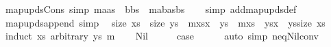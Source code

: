 \begin{isabellebody}
\endisatagproof
{\isafoldproof}%
%
\isadelimproof
\isanewline
%
\endisadelimproof
\isanewline
{}\isamarkupfalse%
\ map{\isacharunderscore}{\kern0pt}upds{\isacharunderscore}{\kern0pt}Cons\ {\isacharbrackleft}{\kern0pt}simp{\isacharbrackright}{\kern0pt}{\isacharcolon}{\kern0pt}\ {\isachardoublequoteopen}m{\isacharparenleft}{\kern0pt}a{\isacharhash}{\kern0pt}as\ {\isacharbrackleft}{\kern0pt}{\isasymmapsto}{\isacharbrackright}{\kern0pt}\ b{\isacharhash}{\kern0pt}bs{\isacharparenright}{\kern0pt}\ {\isacharequal}{\kern0pt}\ {\isacharparenleft}{\kern0pt}m{\isacharparenleft}{\kern0pt}a{\isasymmapsto}b{\isacharparenright}{\kern0pt}{\isacharparenright}{\kern0pt}{\isacharparenleft}{\kern0pt}as{\isacharbrackleft}{\kern0pt}{\isasymmapsto}{\isacharbrackright}{\kern0pt}bs{\isacharparenright}{\kern0pt}{\isachardoublequoteclose}\isanewline
%
\isadelimproof
\ \ %
\endisadelimproof
%
\isatagproof
{}\isamarkupfalse%
\ {\isacharparenleft}{\kern0pt}simp\ add{\isacharcolon}{\kern0pt}map{\isacharunderscore}{\kern0pt}upds{\isacharunderscore}{\kern0pt}def{\isacharparenright}{\kern0pt}%
\endisatagproof
{\isafoldproof}%
%
\isadelimproof
\isanewline
%
\endisadelimproof
\isanewline
{}\isamarkupfalse%
\ map{\isacharunderscore}{\kern0pt}upds{\isacharunderscore}{\kern0pt}append{}\ {\isacharbrackleft}{\kern0pt}simp{\isacharbrackright}{\kern0pt}{\isacharcolon}{\kern0pt}\isanewline
\ \ {\isachardoublequoteopen}size\ xs\ {\isacharless}{\kern0pt}\ size\ ys\ {\isasymLongrightarrow}\ m{\isacharparenleft}{\kern0pt}xs{\isacharat}{\kern0pt}{\isacharbrackleft}{\kern0pt}x{\isacharbrackright}{\kern0pt}\ {\isacharbrackleft}{\kern0pt}{\isasymmapsto}{\isacharbrackright}{\kern0pt}\ ys{\isacharparenright}{\kern0pt}\ {\isacharequal}{\kern0pt}\ m{\isacharparenleft}{\kern0pt}xs\ {\isacharbrackleft}{\kern0pt}{\isasymmapsto}{\isacharbrackright}{\kern0pt}\ ys{\isacharparenright}{\kern0pt}{\isacharparenleft}{\kern0pt}x\ {\isasymmapsto}\ ys{\isacharbang}{\kern0pt}size\ xs{\isacharparenright}{\kern0pt}{\isachardoublequoteclose}\isanewline
%
\isadelimproof
%
\endisadelimproof
%
\isatagproof
{}\isamarkupfalse%
\ {\isacharparenleft}{\kern0pt}induct\ xs\ arbitrary{\isacharcolon}{\kern0pt}\ ys\ m{\isacharparenright}{\kern0pt}\isanewline
\ \ \isamarkupfalse%
\ Nil\isanewline
\ \ \isamarkupfalse%
\ \isamarkupfalse%
\ {\isacharquery}{\kern0pt}case\isanewline
\ \ \ \ \isamarkupfalse%
\ {\isacharparenleft}{\kern0pt}auto\ simp{\isacharcolon}{\kern0pt}\ neq{\isacharunderscore}{\kern0pt}Nil{\isacharunderscore}{\kern0pt}conv{\isacharparenright}{\kern0pt}\isanewline

\end{isabellebody}
